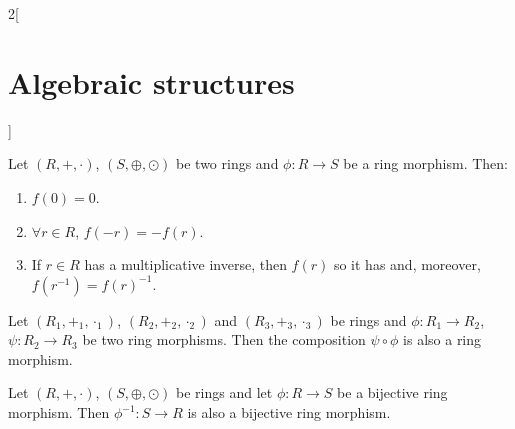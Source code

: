 \documentclass[../../../main.tex]{subfiles}
\begin{document}
\begin{multicols}{2}[\section{Algebraic structures}]
\begin{lemma}
\end{lemma}
\begin{prop}
    Let $(R,+,\cdot)$, $(S,\oplus,\odot)$ be two rings and $\phi:R\rightarrow S$ be a ring morphism. Then:
    \begin{enumerate}
        \item $f(0)=0$.
        \item $\forall r\in R$, $f(-r)=-f(r)$.
        \item If $r\in R$ has a multiplicative inverse, then $f(r)$ so it has and, moreover, $f(r^{-1})=f(r)^{-1}$.
    \end{enumerate}
\end{prop}
\begin{prop}
    Let $(R_1,+_1,\cdot_1)$, $(R_2,+_2,\cdot_2)$ and $(R_3,+_3,\cdot_3)$ be rings and $\phi:R_1\rightarrow R_2$, $\psi:R_2\rightarrow R_3$ be two ring morphisms. Then the composition $\psi\circ\phi$ is also a ring morphism.
\end{prop}
\begin{prop}
    Let $(R,+,\cdot)$, $(S,\oplus,\odot)$ be rings and let $\phi: R\rightarrow S$ be a bijective ring morphism. Then $\phi^{-1}: S\rightarrow R$ is also a bijective ring morphism.
\end{prop}

\end{multicols}
\end{document}
